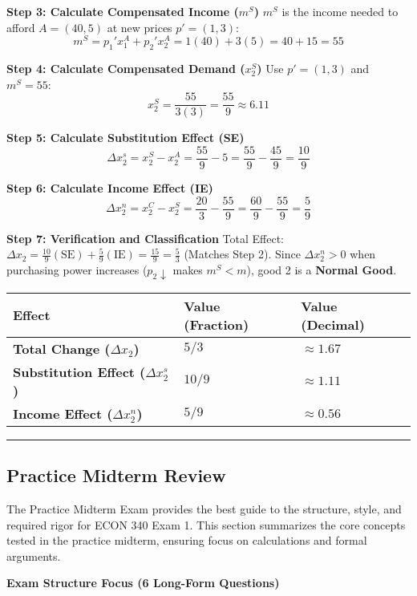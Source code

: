 \documentclass{article}
\begin{document}
\textbf{Step 3: Calculate Compensated Income ($m^S$)}
$m^S$ is the income needed to afford $A=(40, 5)$ at new prices $p'=(1, 3)$:
\[ m^S = p_1' x_1^A + p_2' x_2^A = 1(40) + 3(5) = 40 + 15 = 55 \]

\textbf{Step 4: Calculate Compensated Demand ($x_2^S$)}
Use $p'=(1, 3)$ and $m^S=55$:
\[ x_2^S = \frac{55}{3(3)} = \frac{55}{9} \approx 6.11 \]

\textbf{Step 5: Calculate Substitution Effect (SE)}
\[\Delta x_2^s = x_2^S - x_2^A = \frac{55}{9} - 5 = \frac{55}{9} - \frac{45}{9} = \frac{10}{9}\]

\textbf{Step 6: Calculate Income Effect (IE)}
\[\Delta x_2^n = x_2^C - x_2^S = \frac{20}{3} - \frac{55}{9} = \frac{60}{9} - \frac{55}{9} = \frac{5}{9}\]

\textbf{Step 7: Verification and Classification}
Total Effect: $\Delta x_2 = \frac{10}{9} (\text{SE}) + \frac{5}{9} (\text{IE}) = \frac{15}{9} = \frac{5}{3}$ (Matches Step 2).
Since $\Delta x_2^n > 0$ when purchasing power increases ($p_2 \downarrow$ makes $m^S < m$), good 2 is a \textbf{Normal Good}.

\begin{center}
\begin{tabular}{lll}
\toprule
Effect & Value (Fraction) & Value (Decimal) \\
\midrule
\textbf{Total Change ($\Delta x_2$)} & $5/3$ & $\approx 1.67$ \\
\textbf{Substitution Effect ($\Delta x_2^s$)} & $10/9$ & $\approx 1.11$ \\
\textbf{Income Effect ($\Delta x_2^n$)} & $5/9$ & $\approx 0.56$ \\
\bottomrule

\end{tabular}

\end{center}

\bigskip\noindent\rule{\linewidth}{0.4pt}

\subsection{Practice Midterm Review}

The Practice Midterm Exam provides the best guide to the structure, style, and required rigor for ECON 340 Exam 1. This section summarizes the core concepts tested in the practice midterm, ensuring focus on calculations and formal arguments.

\textbf{Exam Structure Focus (6 Long-Form Questions)}
\end{document}
